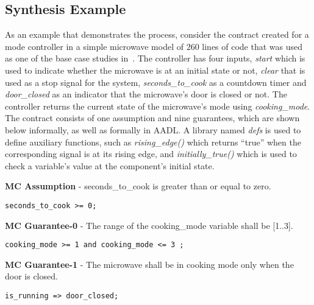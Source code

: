 \subsection{Synthesis Example}
As an example that demonstrates the process, consider the contract created for
a mode controller in a simple microwave model of 260 lines of code that was
used as one of the base case studies in~\cite{Katis15:Realizability}. The
controller has four inputs, \textit{start} which is used to indicate whether the microwave is at an initial
state or not, \textit{clear} that is used as a stop signal for the system,
\textit{seconds\_to\_cook} as a countdown timer and \textit{door\_closed} as an
indicator that the microwave's door is closed or not. The controller returns the
current state of the microwave's mode using \textit{cooking\_mode}. The contract
consists of one assumption and nine guarantees, which are shown below
informally, as well as formally in AADL. A library named \textit{defs} is used
to define auxiliary functions, such as \textit{rising\_edge()} which returns ``true'' when the corresponding signal is at its rising edge, and \textit{initially\_true()} which is used to
check a variable's value at the component's initial state.

\begin{requirement}
\textbf{MC Assumption} - seconds\_to\_cook is greater than or equal to
zero.
\begin{verbatim}
seconds_to_cook >= 0;
\end{verbatim}
\label{req:micasm}
\end{requirement}
%
\begin{requirement}
\textbf{MC Guarantee-0} - The range of the cooking\_mode variable shall be
[1..3].
\begin{verbatim}
cooking_mode >= 1 and cooking_mode <= 3 ;
\end{verbatim}
\label{req:mic0}
\end{requirement}
%
\begin{requirement}
\textbf{MC Guarantee-1} - The microwave shall be in cooking mode only when the
door is closed.
\begin{Verbatim}[obeytabs,fontsize=\small]
is_running => door_closed;
\end{Verbatim}
\label{req:mic1}
\end{requirement}

